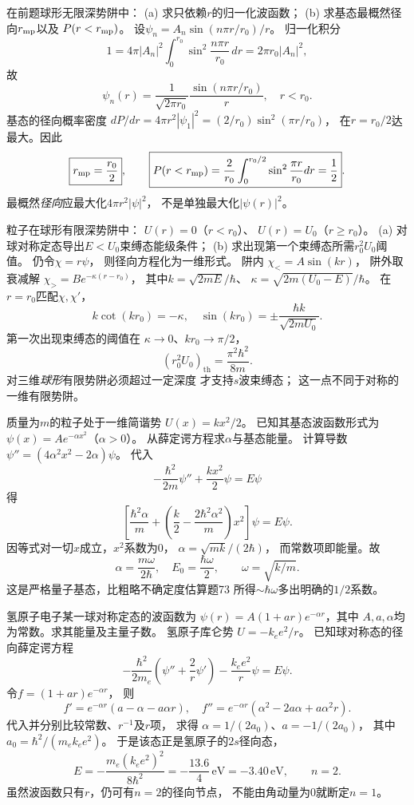 在前题球形无限深势阱中：
(a) 求只依赖$r$的归一化波函数；
(b) 求基态最概然径向$r_{\rm mp}$以及
$P(r<r_{\rm mp})$。
\exsolution
设$\psi_n=A_n\sin(n\pi r/r_0)/r$。
归一化积分
\[
 1=4\pi|A_n|^2\int_0^{r_0}
 \sin^2\frac{n\pi r}{r_0}\,dr
 =2\pi r_0|A_n|^2,
\]
故
\[
 \boxed{\psi_n(r)=\frac1{\sqrt{2\pi r_0}}
 \frac{\sin(n\pi r/r_0)}r},\quad r<r_0.
\]
基态的径向概率密度
$dP/dr=4\pi r^2|\psi_1|^2
=(2/r_0)\sin^2(\pi r/r_0)$，
在$r=r_0/2$达最大。因此
\[
 \boxed{r_{\rm mp}=\frac{r_0}2},\qquad
 \boxed{P(r<r_{\rm mp})=\frac2{r_0}
 \int_0^{r_0/2}\sin^2\frac{\pi r}{r_0}dr=\frac12}.
\]
\excheck 最概然\emph{径向}应最大化$4\pi r^2|\psi|^2$，
不是单独最大化$|\psi(r)|^2$。

粒子在球形有限深势阱中：
$U(r)=0$（$r<r_0$）、
$U(r)=U_0$（$r\ge r_0$）。
(a) 对球对称定态导出$E<U_0$束缚态能级条件；
(b) 求出现第一个束缚态所需$r_0^2U_0$阈值。
\exsolution
仍令$\chi=r\psi$，
则径向方程化为一维形式。
阱内
$\chi_<=A\sin(kr)$，
阱外取衰减解
$\chi_>=B e^{-\kappa(r-r_0)}$，
其中$k=\sqrt{2mE}/\hbar$、
$\kappa=\sqrt{2m(U_0-E)}/\hbar$。
在$r=r_0$匹配$\chi,\chi'$，
\[
 \boxed{k\cot(kr_0)=-\kappa},
 \quad
 \boxed{\sin(kr_0)=\pm\frac{\hbar k}{\sqrt{2mU_0}}}.
\]
第一次出现束缚态的阈值在
$\kappa\to0$、$kr_0\to\pi/2$，
\[
 \boxed{(r_0^2U_0)_{\mathrm{th}}=
 \frac{\pi^2\hbar^2}{8m}}.
\]
\excheck 对三维\emph{球形}有限势阱必须超过一定深度
才支持$s$波束缚态；
这一点不同于对称的一维有限势阱。

质量为$m$的粒子处于一维简谐势
$U(x)=kx^2/2$。
已知其基态波函数形式为
$\psi(x)=A e^{-\alpha x^2}$（$\alpha>0$）。
从薛定谔方程求$\alpha$与基态能量。
\exsolution
计算导数
$\psi''=(4\alpha^2x^2-2\alpha)\psi$。
代入
\[
 -\frac{\hbar^2}{2m}\psi''+\frac{kx^2}{2}\psi=E\psi
\]
得
\[
 \left[\frac{\hbar^2\alpha}{m}
 +\left(\frac k2-\frac{2\hbar^2\alpha^2}{m}\right)x^2\right]\psi
 =E\psi.
\]
因等式对一切$x$成立，$x^2$系数为0，
$\alpha=\sqrt{mk}/(2\hbar)$，
而常数项即能量。故
\[
 \boxed{\alpha=\frac{m\omega}{2\hbar}},\quad
 \boxed{E_0=\frac{\hbar\omega}{2}},
 \qquad \omega=\sqrt{k/m}.
\]
\excheck 这是严格量子基态，比粗略不确定度估算题73
所得$\sim\hbar\omega$多出明确的$1/2$系数。

氢原子电子某一球对称定态的波函数为
$\psi(r)=A(1+ar)e^{-\alpha r}$，其中
$A,a,\alpha$均为常数。求其能量及主量子数。
\exsolution
氢原子库仑势
$U=-k_ee^2/r$。
已知球对称态的径向薛定谔方程
\[
 -\frac{\hbar^2}{2m_e}
 \left(\psi''+\frac2r\psi'\right)
 -\frac{k_ee^2}{r}\psi=E\psi.
\]
令$f=(1+ar)e^{-\alpha r}$，
则
\[
 f'=e^{-\alpha r}(a-\alpha-a\alpha r),\quad
 f''=e^{-\alpha r}(\alpha^2-2a\alpha+a\alpha^2r).
\]
代入并分别比较常数、$r^{-1}$及$r$项，
求得
$\alpha=1/(2a_0)$、$a=-1/(2a_0)$，
其中$a_0=\hbar^2/(m_ek_ee^2)$。
于是该态正是氢原子的$2s$径向态，
\[
 \boxed{E=-\frac{m_e(k_ee^2)^2}{8\hbar^2}
 =-\frac{13.6}{4}\,\mathrm{eV}=-3.40\,\mathrm{eV}},
 \qquad\boxed{n=2}.
\]
\excheck 虽然波函数只有$r$，仍可有$n=2$的径向节点，
不能由角动量为0就断定$n=1$。

